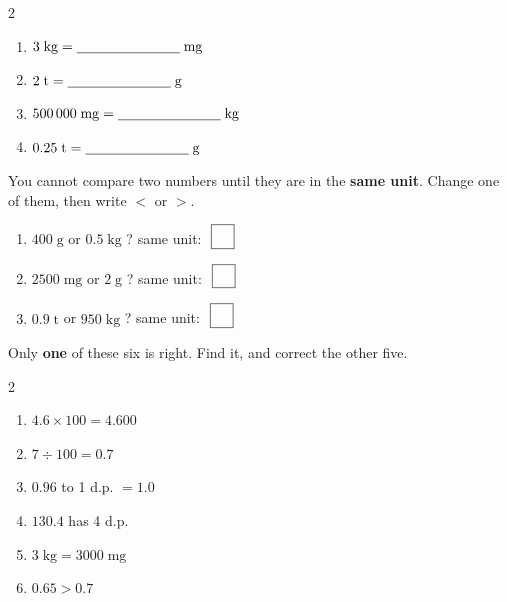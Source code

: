 \documentclass[12pt,a4paper]{article}
\newcommand{\nbox}{\ \fbox{\rule{0pt}{1.05em}\rule{1.0em}{0pt}}\ }
\begin{document}
\vspace{2pt}
\begin{multicols}{2}
\begin{enumerate}[label=(\alph*), itemsep=11pt]
  \item $3 \; \mathrm{kg} = \blank[2.6cm] \; \mathrm{mg}$
  \item $2 \; \mathrm{t} = \blank[2.6cm] \; \mathrm{g}$
  \item $500\,000 \; \mathrm{mg} = \blank[2.6cm] \; \mathrm{kg}$
  \item $0.25 \; \mathrm{t} = \blank[2.6cm] \; \mathrm{g}$
\end{enumerate}
\end{multicols}


\noindent You cannot compare two numbers until they are in the \textbf{same unit}.
Change one of them, then write $<$ or $>$.

\vspace{4pt}
\begin{enumerate}[label=(\alph*), itemsep=10pt]
  \item $400 \; \mathrm{g}$ \quad or \quad $0.5 \; \mathrm{kg}$ \; ?
        \hfill same unit: \blank[3.0cm] \quad $\nbox$
  \item $2500 \; \mathrm{mg}$ \quad or \quad $2 \; \mathrm{g}$ \; ?
        \hfill same unit: \blank[3.0cm] \quad $\nbox$
  \item $0.9 \; \mathrm{t}$ \quad or \quad $950 \; \mathrm{kg}$ \; ?
        \hfill same unit: \blank[3.0cm] \quad $\nbox$
\end{enumerate}


\noindent Only \textbf{one} of these six is right. Find it, and correct the other five.

\vspace{4pt}
\begin{multicols}{2}
\begin{enumerate}[label=(\alph*), itemsep=12pt]
  \item $4.6 \times 100 = 4.600$ \; \blank[2.6cm]
  \item $7 \div 100 = 0.7$ \; \blank[2.6cm]
  \item $0.96$ to 1 d.p. $= 1.0$ \; \blank[2.6cm]
  \item $130.4$ has 4 d.p. \; \blank[2.6cm]
  \item $3 \; \mathrm{kg} = 3000 \; \mathrm{mg}$ \; \blank[2.6cm]
  \item $0.65 > 0.7$ \; \blank[2.6cm]
\end{enumerate}
\end{multicols}
\end{document}
